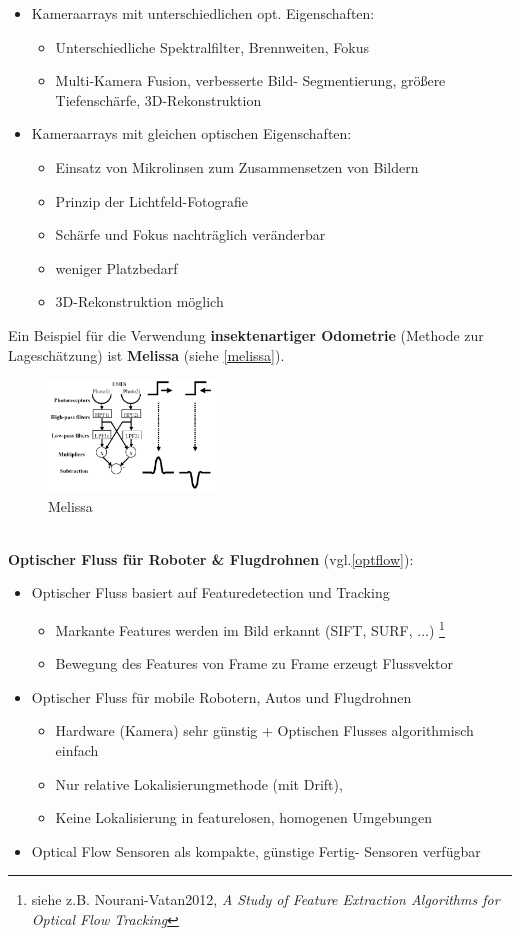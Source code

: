 \begin{itemize}
\item Kameraarrays mit unterschiedlichen opt. Eigenschaften:
\begin{itemize}
\item Unterschiedliche Spektralfilter, Brennweiten, Fokus
\item Multi-Kamera Fusion, verbesserte Bild- Segmentierung, größere Tiefenschärfe, 3D-Rekonstruktion
\end{itemize}
\item Kameraarrays mit gleichen optischen Eigenschaften:
\begin{itemize}
\item Einsatz von Mikrolinsen zum Zusammensetzen von Bildern
\item Prinzip der Lichtfeld-Fotografie
\item Schärfe und Fokus nachträglich veränderbar
\item weniger Platzbedarf
\item 3D-Rekonstruktion möglich
\end{itemize}
\end{itemize}
Ein Beispiel für die Verwendung \textbf{insektenartiger Odometrie} (Methode zur Lageschätzung) ist \glqq \textbf{Melissa}\grqq{} (siehe \autoref{melissa}).
\begin{figure}[h!]
	\centering
	\includegraphics[width=0.4\textwidth]{figures/ch04_melissa.png}
	\caption{Melissa}
	\label{melissa}
\end{figure}\\
\textbf{Optischer Fluss für Roboter \& Flugdrohnen} (vgl.\autoref{optflow}):
\begin{itemize}
\item Optischer Fluss basiert auf Featuredetection und Tracking
\begin{itemize}
\item Markante Features werden im Bild erkannt (SIFT, SURF, ...) \footnote{siehe z.B. Nourani-Vatan2012, \textit{A Study of Feature Extraction Algorithms for Optical Flow Tracking}}
\item Bewegung des Features von Frame zu Frame erzeugt Flussvektor
\end{itemize}
\item Optischer Fluss für mobile Robotern, Autos und Flugdrohnen
\begin{itemize}
\item Hardware (Kamera) sehr günstig + Optischen Flusses algorithmisch einfach
\item Nur relative Lokalisierungmethode (mit Drift),
\item Keine Lokalisierung in featurelosen, homogenen Umgebungen
\end{itemize}
\item Optical Flow Sensoren als kompakte, günstige \glqq Fertig\grqq- Sensoren verfügbar
\end{itemize}
